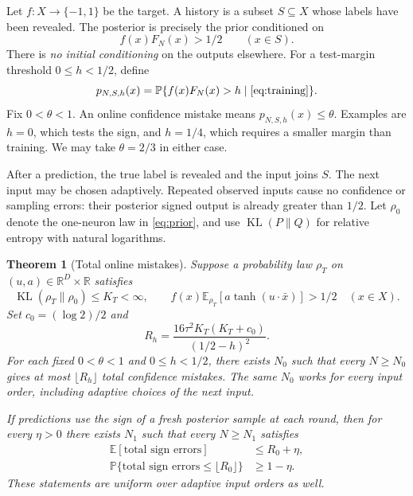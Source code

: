 \documentclass[11pt]{article}
\newtheorem{theorem}{Theorem}
\newcommand{\R}{\mathbb R}
\newcommand{\E}{\mathbb E}
\newcommand{\Pp}{\mathbb P}
\newcommand{\KL}{\operatorname{KL}}
\begin{document}
Let $f:X\to\{-1,1\}$ be the target. A history is a subset $S\subseteq X$
whose labels have been revealed. The posterior is precisely the prior
conditioned on
\begin{equation}\label{eq:training}
 f(x)F_N(x)>1/2\qquad(x\in S).
\end{equation}
There is \emph{no initial conditioning} on the outputs elsewhere. For a
test-margin threshold $0\le h<1/2$, define
\[
 p_{N,S,h}(x)=\Pp\{f(x)F_N(x)>h\mid \eqref{eq:training}\}.
\]
Fix $0<\theta<1$. An online confidence mistake means
$p_{N,S,h}(x)\le\theta$. Examples are $h=0$, which tests the sign, and
$h=1/4$, which requires a smaller margin than training. We may take
$\theta=2/3$ in either case.

After a prediction, the true label is revealed and the input joins $S$.
The next input may be chosen adaptively. Repeated observed inputs cause
no confidence or sampling errors: their posterior signed output is
already greater than $1/2$. Let $\rho_0$ denote the one-neuron law in
\eqref{eq:prior}, and use $\KL(P\|Q)$ for relative entropy with natural
logarithms.

\begin{theorem}[Total online mistakes]\label{thm:main}
Suppose a probability law $\rho_T$ on $(u,a)\in\R^D\times\R$ satisfies
\begin{equation}\label{eq:certificate}
 \KL(\rho_T\|\rho_0)\le K_T<\infty,
 \qquad
 f(x)\E_{\rho_T}[a\tanh(u\cdot\bar x)]>1/2\quad(x\in X).
\end{equation}
Set $c_0=(\log2)/2$ and
\begin{equation}\label{eq:Rh}
 R_h=\frac{16\tau^2 K_T(K_T+c_0)}{(1/2-h)^2}.
\end{equation}
For each fixed $0<\theta<1$ and $0\le h<1/2$, there exists $N_0$ such
that every $N\ge N_0$ gives at most $\lfloor R_h\rfloor$ total
confidence mistakes. The same $N_0$ works for every input order,
including adaptive choices of the next input.

If predictions use the sign of a fresh posterior sample at each round,
then for every $\eta>0$ there exists $N_1$ such that every $N\ge N_1$
satisfies
\begin{align}
 \E[\text{total sign errors}]&\le R_0+\eta,\label{eq:expectation}\\
 \Pp\{\text{total sign errors}\le\lfloor R_0\rfloor\}
 &\ge1-\eta.\label{eq:hp}
\end{align}
These statements are uniform over adaptive input orders as well.
\end{theorem}
\end{document}
